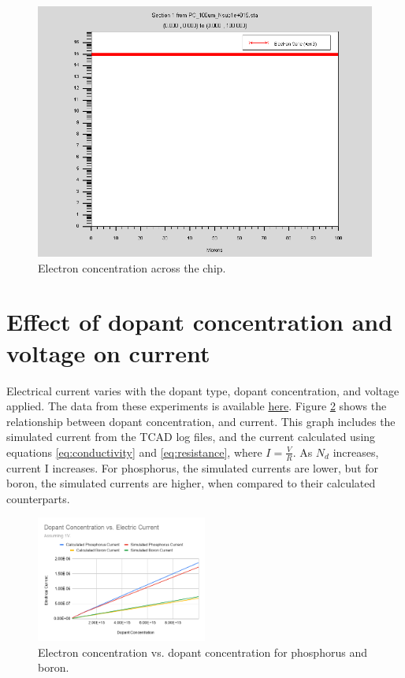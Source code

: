 \documentclass[12pt]{article}
\begin{document}
\begin{figure}[H]
  \centering
  \includegraphics[width=\textwidth]{econc}
  \caption{Electron concentration across the chip.}
  \label{fig:econc}
\end{figure}

\section{Effect of dopant concentration and voltage on current}

Electrical current varies with the dopant type, dopant concentration, and voltage applied. The data from these experiments is available \href{https://docs.google.com/spreadsheets/d/1gYwgjLNNKRn5CSeJdrwOt3nx-jSYUwJLR_BUbzWCe9E/edit?usp=sharing}{here}. Figure \ref{fig:concvcurrent} shows the relationship between dopant concentration, and current. This graph includes the simulated current from the TCAD log files, and the current calculated using equations \eqref{eq:conductivity} and \eqref{eq:resistance}, where $I=\frac{V}{R}$. As $N_d$ increases, current {{I}} increases. For phosphorus, the simulated currents are lower, but for boron, the simulated currents are higher, when compared to their calculated counterparts.

\begin{figure}[H]
  \centering
  \includegraphics[width=0.5\textwidth]{concvcurrent}
  \caption{Electron concentration vs. dopant concentration for phosphorus and boron.}
  \label{fig:concvcurrent}
\end{figure}
\end{document}
